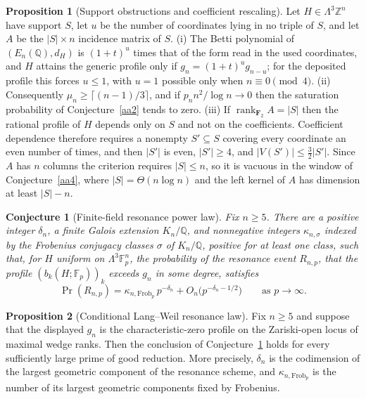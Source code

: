\documentclass[11pt]{article}
\newtheorem{conjecture}{Conjecture}
\theoremstyle{definition}
\newcommand{\Z}{\mathbb Z}
\newcommand{\Q}{\mathbb Q}
\providecommand{\Z}{\mathbb Z}
\providecommand{\Q}{\mathbb Q}
\newtheorem{proposition}{Proposition}
\begin{document}
\begin{proposition}[Support obstructions and coefficient rescaling]\label{aa:support}
Let $H\in\Lambda^3\Z^n$ have support $S$, let $u$ be the number of coordinates lying in no triple of $S$, and let $A$ be the $|S|\times n$ incidence matrix of $S$.
(i) The Betti polynomial of $(E_n(\mathbb Q),d_H)$ is $(1+t)^{u}$ times that of the form read in the used coordinates, and $H$ attains the generic profile only if $g_n=(1+t)^{u}g_{n-u}$; for the deposited profile this forces $u\le1$, with $u=1$ possible only when $n\equiv0\pmod4$.
(ii) Consequently $\mu_n\ge\lceil(n-1)/3\rceil$, and if $p_nn^2/\log n\to0$ then the saturation probability of Conjecture~\ref{aa2} tends to zero.
(iii) If $\operatorname{rank}_{\mathbf F_2}A=|S|$ then the rational profile of $H$ depends only on $S$ and not on the coefficients.  Coefficient dependence therefore requires a nonempty $S'\subseteq S$ covering every coordinate an even number of times, and then $|S'|$ is even, $|S'|\ge4$, and $|V(S')|\le\tfrac32|S'|$.  Since $A$ has $n$ columns the criterion requires $|S|\le n$, so it is vacuous in the window of Conjecture~\ref{aa4}, where $|S|=\Theta(n\log n)$ and the left kernel of $A$ has dimension at least $|S|-n$.
\end{proposition}

\begin{conjecture}[Finite-field resonance power law]\label{aa5}
Fix $n\ge5$.  There are a positive integer $\delta_n$, a finite Galois extension $K_n/\Q$, and nonnegative integers $\kappa_{n,\sigma}$ indexed by the Frobenius conjugacy classes $\sigma$ of $K_n/\Q$, positive for at least one class, such that, for $H$ uniform on $\Lambda^3\mathbb F_p^n$, the probability of the resonance event $R_{n,p}$, that the profile $(b_k(H;\mathbb F_p))_k$ exceeds $g_n$ in some degree, satisfies
\[
\Pr(R_{n,p})=\kappa_{n,\mathrm{Frob}_p}\,p^{-\delta_n}+O_n\bigl(p^{-\delta_n-1/2}\bigr)
\qquad\text{as }p\to\infty.
\]
\end{conjecture}

\begin{proposition}[Conditional Lang--Weil resonance law]\label{aa:langweil}
Fix $n\ge5$ and suppose that the displayed $g_n$ is the characteristic-zero profile on the Zariski-open locus of maximal wedge ranks.  Then the conclusion of Conjecture~\ref{aa5} holds for every sufficiently large prime of good reduction.  More precisely, $\delta_n$ is the codimension of the largest geometric component of the resonance scheme, and $\kappa_{n,\mathrm{Frob}_p}$ is the number of its largest geometric components fixed by Frobenius.
\end{proposition}
\end{document}
